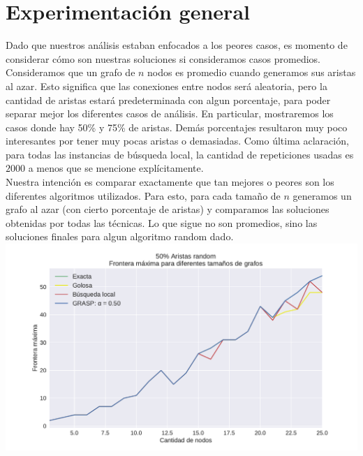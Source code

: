 \section{Experimentación general}

Dado que nuestros análisis estaban enfocados a los peores casos, es momento de considerar cómo son nuestras soluciones si consideramos casos promedios.  \\

Consideramos que un grafo de $n$ nodos es promedio cuando generamos sus aristas al azar. Esto significa que las conexiones entre nodos será aleatoria, pero la cantidad de aristas estará predeterminada con algun porcentaje, para poder separar mejor los diferentes casos de análisis. En particular, mostraremos los casos donde hay 50\% y 75\% de aristas. Demás porcentajes resultaron muy poco interesantes por tener muy pocas aristas o demasiadas. Como última aclaración, para todas las instancias de búsqueda local, la cantidad de repeticiones usadas es $2000$ a menos que se mencione explícitamente. \\

Nuestra intención es comparar exactamente que tan mejores o peores son los diferentes algoritmos utilizados. Para esto, para cada tamaño de $n$ generamos un grafo al azar (con cierto porcentaje de aristas) y comparamos las soluciones obtenidas por todas las técnicas. Lo que sigue no son promedios, sino las soluciones finales para algun algoritmo random dado. \\

{\centering
    \includegraphics[width=1\textwidth]{informe/imgs/exp_random50_frontera_todos_v2.pdf}
}
$ $ \newline

